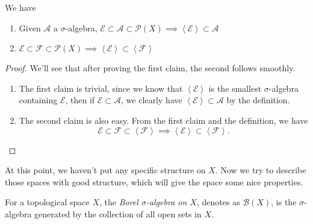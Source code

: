 \begin{lemma}
	\label{lma:lec2-1}
	We have
	\begin{enumerate}
		\item Given \(\mathcal{A}\) a \(\sigma\)-algebra, \(\mathcal{E} \subset \mathcal{A} \subset \mathcal{P} (X)\implies \left<\mathcal{E}\right> \subset \mathcal{A} \)
		\item \(\mathcal{E} \subset \mathcal{F} \subset \mathcal{P} (X)\implies \left<\mathcal{E}\right> \subset\left<\mathcal{F} \right>\)
	\end{enumerate}
\end{lemma}
\begin{proof}
	We'll see that after proving the first claim, the second follows smoothly.
	\begin{enumerate}
		\item The first claim is trivial, since we know that \(\left<\mathcal{E} \right>\) is the smallest \(\sigma\)-algebra containing \(\mathcal{E} \),
		      then if \(\mathcal{E} \subset \mathcal{A} \), we clearly have \(\left<\mathcal{E} \right>\subset \mathcal{A} \) by the definition.
		\item The second claim is also easy. From the first claim and the definition, we have
		      \[
			      \mathcal{E} \subset \mathcal{F} \subset \left< \mathcal{F} \right> \implies \left< \mathcal{E} \right>\subset \left< \mathcal{F} \right>.
		      \]
	\end{enumerate}
\end{proof}

At this point, we haven't put any specific structure on \(X\). Now we try to describe those spaces with good structure, which will give the space some nice properties.

\begin{definition}
	For a topological space \(X\), the \emph{Borel \(\sigma\)-algebra on \(X\)}, denotes as \(\mathcal{B}(X)\),
	is the \(\sigma\)-algebra generated by the collection of all open sets in \(X\).
\end{definition}

